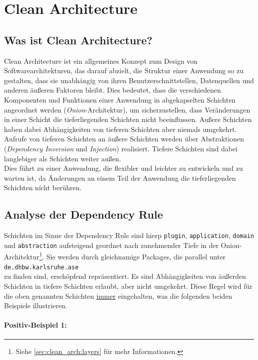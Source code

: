 \chapter{Clean Architecture}

\section{Was ist Clean Architecture?}

Clean Architecture ist ein allgemeines Konzept zum Design von Softwarearchitekturen, das darauf abzielt, 
die Struktur einer Anwendung so zu gestalten, dass sie unabhängig von ihren Benutzerschnittstellen, 
Datenquellen und anderen äußeren Faktoren bleibt. 
Dies bedeutet, dass die verschiedenen Komponenten 
und Funktionen einer Anwendung in abgekapselten Schichten angeordnet werden (\textit{Onion}-Architektur), 
um sicherzustellen, dass Veränderungen in einer Schicht die tieferliegenden Schichten nicht beeinflussen. 
Außere Schichten haben dabei Abhängigkeiten von tieferen Schichten aber niemals umgekehrt.
Aufrufe von tieferen Schichten an äußere Schichten werden über Abstraktionen (\textit{Dependency Inversion} und 
\textit{Injection}) realisiert. Tiefere Schichten sind dabei langlebiger als Schichten weiter außen. \\
Dies führt zu einer Anwendung, die flexibler und leichter zu entwickeln und zu warten ist, 
da Änderungen an einem Teil der Anwendung die tieferliegenden Schichten nicht berühren.

\section{Analyse der Dependency Rule}

Schichten im Sinne der Dependency Rule sind hierp \texttt{plugin}, \texttt{application}, \texttt{domain} 
und \texttt{abstraction} aufsteigend geordnet nach zunehmender Tiefe in der Onion-Architektur\footnote{Siehe \autoref{sec:clean_arch:layers} für mehr Informationen.}. 
Sie werden durch gleichnamige Packages, die parallel unter \\ 
\texttt{de.dhbw.karlsruhe.ase} \\
zu finden sind, erschöpfend repräsentiert. 
Es sind Abhängigkeiten von äußerden Schichten in tiefere Schichten erlaubt, aber nicht umgekehrt.
Diese Regel wird für die oben genannten Schichten \underline{immer} eingehalten, 
was die folgenden beiden Beispiele illustrieren.  

\subsubsection{Positiv-Beispiel 1:}

